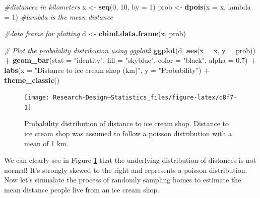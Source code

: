 \documentclass[
]{book}
\newenvironment{Shaded}{\begin{snugshade}}{\end{snugshade}}
\newcommand{\AttributeTok}[1]{\textcolor[rgb]{0.13,0.29,0.53}{#1}}
\newcommand{\CommentTok}[1]{\textcolor[rgb]{0.56,0.35,0.01}{\textit{#1}}}
\newcommand{\DecValTok}[1]{\textcolor[rgb]{0.00,0.00,0.81}{#1}}
\newcommand{\FloatTok}[1]{\textcolor[rgb]{0.00,0.00,0.81}{#1}}
\newcommand{\FunctionTok}[1]{\textcolor[rgb]{0.13,0.29,0.53}{\textbf{#1}}}
\newcommand{\NormalTok}[1]{#1}
\newcommand{\OtherTok}[1]{\textcolor[rgb]{0.56,0.35,0.01}{#1}}
\newcommand{\SpecialCharTok}[1]{\textcolor[rgb]{0.81,0.36,0.00}{\textbf{#1}}}
\newcommand{\StringTok}[1]{\textcolor[rgb]{0.31,0.60,0.02}{#1}}
\begin{document}
\begin{Shaded}
\begin{Highlighting}[]
\CommentTok{\#distances in kilometers}
\NormalTok{x }\OtherTok{\textless{}{-}} \FunctionTok{seq}\NormalTok{(}\DecValTok{0}\NormalTok{, }\DecValTok{10}\NormalTok{, }\AttributeTok{by =} \DecValTok{1}\NormalTok{)}
\NormalTok{prob }\OtherTok{\textless{}{-}} \FunctionTok{dpois}\NormalTok{(}\AttributeTok{x =}\NormalTok{ x, }\AttributeTok{lambda =} \DecValTok{1}\NormalTok{) }\CommentTok{\#lambda is the mean distance}

\CommentTok{\#data frame for plotting}
\NormalTok{d }\OtherTok{\textless{}{-}} \FunctionTok{cbind.data.frame}\NormalTok{(x, prob)}

\CommentTok{\# Plot the probability distribution using ggplot2}
\FunctionTok{ggplot}\NormalTok{(d, }\FunctionTok{aes}\NormalTok{(}\AttributeTok{x =}\NormalTok{ x, }\AttributeTok{y =}\NormalTok{ prob)) }\SpecialCharTok{+}
  \FunctionTok{geom\_bar}\NormalTok{(}\AttributeTok{stat =} \StringTok{"identity"}\NormalTok{, }\AttributeTok{fill =} \StringTok{"skyblue"}\NormalTok{, }\AttributeTok{color =} \StringTok{"black"}\NormalTok{, }\AttributeTok{alpha =} \FloatTok{0.7}\NormalTok{) }\SpecialCharTok{+}
  \FunctionTok{labs}\NormalTok{(}\AttributeTok{x =} \StringTok{"Distance to ice cream shop (km)"}\NormalTok{,}
       \AttributeTok{y =} \StringTok{"Probability"}\NormalTok{) }\SpecialCharTok{+}
  \FunctionTok{theme\_classic}\NormalTok{()}
\end{Highlighting}
\end{Shaded}

\begin{figure}

{\centering \texttt{[image: Research-Design---Statistics\_files/figure-latex/c8f7-1]} 

}

\caption{Probability distribution of distance to ice cream shop. Distance to ice cream shop was assumed to follow a poisson distribution with a mean of 1 km.}\label{fig:c8f7}
\end{figure}

We can clearly see in Figure \ref{fig:c8f7} that the underlying distribution of distances is not normal! It's strongly skewed to the right and represents a poisson distribution. Now let's simualate the process of randomly sampling homes to estimate the mean distance people live from an ice cream shop.
\end{document}
